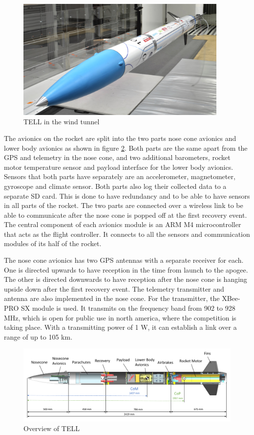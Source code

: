\begin{figure}[ht]
 \centering
 \includegraphics[height=6cm]{images/TELL_1.png}
 \caption{TELL  in the wind tunnel}
 \label{fig:tell_1}
\end{figure}

The avionics on the rocket are split into the two parts nose cone avionics and lower body avionics as shown in figure \ref{fig:tell_structure}.
Both parts are the same apart from the GPS and telemetry in the nose cone, and two additional barometers, rocket motor temperature sensor and payload interface for the lower body avionics.
Sensors that both parts have separately are an accelerometer, magnetometer, gyroscope and climate sensor.
Both parts also log their collected data to a separate SD card.
This is done to have redundancy and to be able to have sensors in all parts of the rocket.
The two parts are connected over a wireless link to be able to communicate after the nose cone is popped off at the first recovery event.
The central component of each avionics module is an ARM M4 microcontroller that acts as the flight controller.
It connects to all the sensors and communication modules of its half of the rocket.

The nose cone avionics has two GPS antennas with a separate receiver for each.
One is directed upwards to have reception in the time from launch to the apogee.
The other is directed downwards to have reception after the nose cone is hanging upside down after the first recovery event.
The telemetry transmitter and antenna are also implemented in the nose cone.
For the transmitter, the XBee-PRO SX module is used.
It transmits on the frequency band from 902 to 928 MHz, which is open for public use in north america, where the competition is taking place.
With a transmitting power of 1 W, it can establish a link over a range of up to 105 km.

\begin{figure}[ht]
 \centering
 \includegraphics[width=\textwidth]{images/TELL_Structure.png}
 \caption{Overview of TELL}
 \label{fig:tell_structure}
\end{figure}

